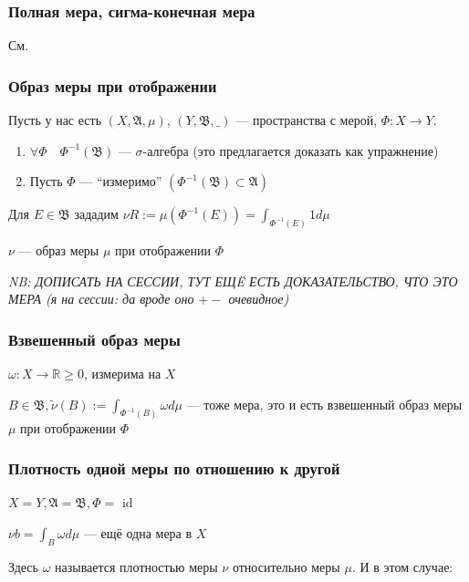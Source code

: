 \documentclass{article}
\begin{document}
\subsubsection{Полная мера, сигма-конечная мера}

См. \href{http://gg.gg/holykpksem3}{\color{blue}{конспект прошлого семестра}}

\subsubsection{Образ меры при отображении}

Пусть у нас есть $(X, \mathfrak{A}, \mu)$, $(Y, \mathfrak{B}, \_ )$ --- пространства с мерой, $\Phi: X \rightarrow Y$.

\begin{enumerate}
    \item $\forall \Phi \quad \Phi^{-1}(\mathfrak{B})$ --- $\sigma$-алгебра (это предлагается доказать как упражнение)
    \item Пусть $\Phi$ --- ``измеримо'' $\left(\Phi^{-1}(\mathfrak{B}) \subset \mathfrak{A}\right)$
\end{enumerate}

Для $E \in \mathfrak{B}$ зададим $\nu R := \mu\left(\Phi^{-1}(E)\right) = \int_{\Phi^{-1}(E)} 1 d \mu$

$\nu$ --- образ меры $\mu$ при отображении $\Phi$

\textit{NB: ДОПИСАТЬ НА СЕССИИ, ТУТ ЕЩË ЕСТЬ ДОКАЗАТЕЛЬСТВО, ЧТО ЭТО МЕРА (я на сессии: да вроде оно $+-$ очевидное)}

\subsubsection{Взвешенный образ меры}

$\omega: X \rightarrow \mathbb{R} \ge 0$, измерима на $X$

$B \in \mathfrak{B}, \tilde{\nu}(B) := \int_{\Phi^{-1}(B)} \omega d\mu$ --- тоже мера, это и есть взвешенный образ меры $\mu$ при отображении $\Phi$

\subsubsection{Плотность одной меры по отношению к другой}

$X = Y, \mathfrak{A} = \mathfrak{B}, \Phi = $ id

$\nu b = \int_{B} \omega d \mu$ --- ещё одна мера в $X$

Здесь $\omega$ называется плотностью меры $\nu$ относительно меры $\mu$. И в этом случае:
\end{document}
